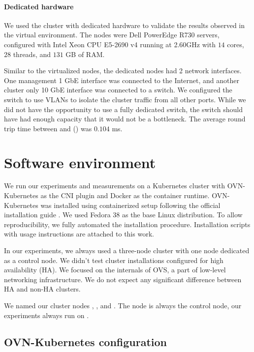 \paragraph{Dedicated hardware}

We used the cluster with dedicated hardware to validate the results observed in the virtual environment. The nodes were Dell PowerEdge R730 servers, configured with Intel\textsuperscript{\textregistered} Xeon\textsuperscript{\textregistered} CPU E5-2690 v4 running at 2.60GHz with $14$ cores, $28$ threads, and $131$ GB of RAM.

Similar to the virtualized nodes, the dedicated nodes had 2 network interfaces. One management 1 GbE interface was connected to the Internet, and another cluster only 10 GbE interface was connected to a switch. We configured the switch to use VLANs to isolate the cluster traffic from all other ports. While we did not have the opportunity to use a fully dedicated switch, the switch should have had enough capacity that it would not be a bottleneck. The average round trip time between  and  () was $0.104$ ms.

\section{Software environment}
\label{sec:sw-env}

We run our experiments and measurements on a Kubernetes cluster with OVN-Kubernetes as the CNI plugin and Docker as the container runtime. OVN-Kubernetes was installed using containerized setup following the official installation guide \cite{OVNInstallGuide}. We used Fedora 38 as the base Linux distribution. To allow reproducibility, we fully automated the installation procedure. Installation scripts with usage instructions are attached to this work.

In our experiments, we always used a three-node cluster with one node dedicated as a control node. We didn't test cluster installations configured for high availability (HA). We focused on the internals of OVS, a part of low-level networking infrastructure. We do not expect any significant difference between HA and non-HA clusters.

We named our cluster nodes , , and . The node  is always the control node, our experiments always run on .

\subsection{OVN-Kubernetes configuration}
\label{subsec:ovnkube-limits}


